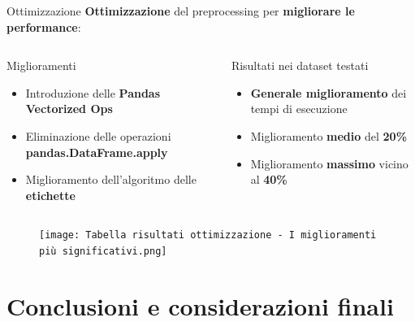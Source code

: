 \documentclass{beamer}
\begin{document}
	\begin{frame}{Ottimizzazione}
		\textbf{Ottimizzazione} del preprocessing per \textbf{migliorare le performance}:

		\begin{columns}
			\begin{column}{0.5\textwidth}
				\begin{block}{Miglioramenti}
					\begin{itemize}
						\item Introduzione delle \textbf{Pandas Vectorized Ops}
						\item Eliminazione delle operazioni \textbf{pandas.DataFrame.apply}
						\item Miglioramento dell'algoritmo delle \textbf{etichette}
					\end{itemize}
				\end{block}
			\end{column}
			\begin{column}{0.5\textwidth}
				\begin{exampleblock}{Risultati nei dataset testati}
					\begin{itemize}
						\item \textbf{Generale miglioramento} dei tempi di esecuzione
						\item Miglioramento \textbf{medio} del \textbf{20\%}
						\item Miglioramento \textbf{massimo} vicino al \textbf{40\%}
					\end{itemize}
				\end{exampleblock}
			\end{column}
		\end{columns}

		\begin{figure}
			\centering
			\texttt{[image: Tabella risultati ottimizzazione - I miglioramenti più significativi.png]}
		\end{figure}
	\end{frame}


	\section{Conclusioni e considerazioni finali}
\end{document}
